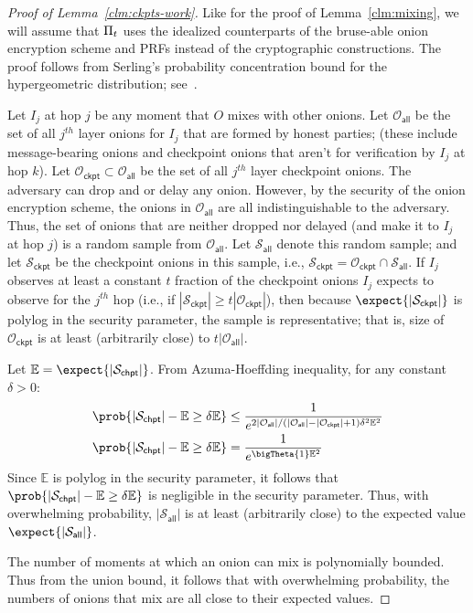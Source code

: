 \documentclass[runningheads,a4paper]{llncs}
\begin{document}
\begin{proof}[Proof of Lemma~\ref{clm:ckpts-work}]
Like for the proof of Lemma~\ref{clm:mixing}, we will assume that $\Pi_t$ uses the idealized counterparts of the bruse-able onion encryption scheme and PRFs instead of the cryptographic constructions. 
The proof follows from Serling's probability concentration bound for the hypergeometric distribution; see~\cite{serfling1974probability}. 

Let $I_j$ at hop $j$ be any moment that $O$ mixes with other onions. Let $\mathcal{O}_{\mathsf{all}}$ be the set of all $j^{th}$ layer onions for $I_j$ that are formed by honest parties; (these include message-bearing onions and checkpoint onions that aren't for verification by $I_j$ at hop $k$). Let $\mathcal{O}_{\mathsf{ckpt}} \subset \mathcal{O}_{\mathsf{all}}$ be the set of all $j^{th}$ layer checkpoint onions. The adversary can drop and or delay any onion. However, by the security of the onion encryption scheme, the onions in $\mathcal{O}_{\mathsf{all}}$ are all indistinguishable to the adversary. Thus, the set of onions that are neither dropped nor delayed (and make it to $I_j$ at hop $j$) is a random sample from $\mathcal{O}_{\mathsf{all}}$. Let $\mathcal{S}_{\mathsf{all}}$ denote this random sample; and let $\mathcal{S}_{\mathsf{ckpt}}$ be the checkpoint onions in this sample, i.e., $\mathcal{S}_{\mathsf{ckpt}} = \mathcal{O}_{\mathsf{ckpt}}\cap\mathcal{S}_{\mathsf{all}}$. 
If $I_j$ observes at least a constant $t$ fraction of the checkpoint onions $I_j$ expects to observe for the $j^{th}$ hop (i.e., if $|\mathcal{S}_{\mathsf{ckpt}}| \ge t|\mathcal{O}_{\mathsf{ckpt}}|$), then because $\expect{|\mathcal{S}_{\mathsf{ckpt}}|}$ is polylog in the security parameter, the sample is representative; that is, size of $\mathcal{O}_{\mathsf{ckpt}}$ is at least (arbitrarily close) to $t|\mathcal{O}_{\mathsf{all}}|$. 

Let $\mathbb{E} = \expect{|\mathcal{S}_{\mathsf{chpt}}|}$. 
From Azuma-Hoeffding inequality, for any constant $\delta >0$:  
\begin{align*}
\prob{|\mathcal{S}_{\mathsf{chpt}}| - \mathbb{E} \ge \delta \mathbb{E}} &\le \frac{1}{e^{2|\mathcal{O}_{\mathsf{all}}|/(|\mathcal{O}_{\mathsf{all}}| - |\mathcal{O}_{\mathsf{ckpt}}| + 1)\delta^2\mathbb{E}^2}} \\
\prob{|\mathcal{S}_{\mathsf{chpt}}| - \mathbb{E} \ge \delta \mathbb{E}} &= \frac{1}{e^{\bigTheta{1}\mathbb{E}^2}}
\end{align*}
Since $\mathbb{E}$ is polylog in the security parameter, it follows that $\prob{|\mathcal{S}_{\mathsf{chpt}}| - \mathbb{E} \ge \delta \mathbb{E}}$ is negligible in the security parameter. Thus, with overwhelming probability, $|\mathcal{S}_{\mathsf{all}}|$ is at least (arbitrarily close) to the expected value $\expect{|\mathcal{S}_{\mathsf{all}}|}$. 

The number of moments at which an onion can mix is polynomially bounded. Thus from the union bound, it follows that with overwhelming probability, the numbers of onions that mix are all close to their expected values. 
\end{proof}
\fi
\end{document}
